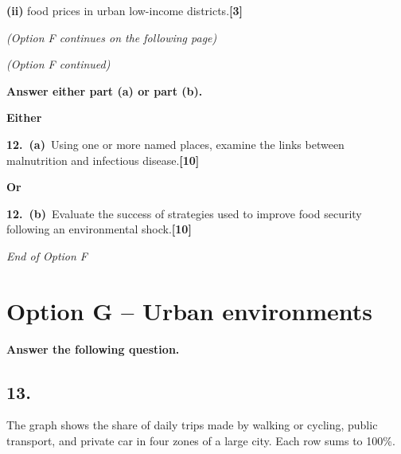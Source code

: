 \documentclass[11pt,a4paper]{article}
\newcommand{\markpts}[1]{\hfill\textbf{[#1]}}
\newcommand{\exam}[1]{#1}
\begin{document}
\medskip
\noindent{}\textbf{(ii)} food prices in urban low-income
districts.\markpts{3}

\vspace{0.6em}
\textit{(Option F continues on the following page)}

\newpage

\textit{(Option F continued)}

\textbf{Answer either part (a) or part (b).}

\medskip
\noindent\textbf{Either}

\medskip
\noindent\textbf{12.\ (a)}~Using one or more named places, \exam{examine} the
links between malnutrition and infectious disease.\markpts{10}

\medskip
\noindent\textbf{Or}

\medskip
\noindent\textbf{12.\ (b)}~\exam{Evaluate} the success of strategies used to
improve food security following an environmental shock.\markpts{10}

\vspace{0.8em}
\textit{End of Option F}

\newpage

\section{Option G -- Urban environments}

\textbf{Answer the following question.}

\subsection{13.}

The graph shows the share of daily trips made by walking or cycling, public
transport, and private car in four zones of a large city. Each row sums to
100\%.
\end{document}
